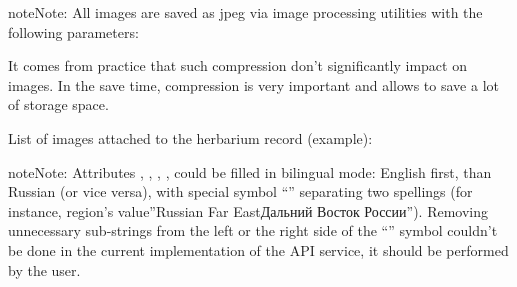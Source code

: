 \documentclass[letterpaper,10pt,english]{sphinxmanual}
\begin{document}
\begin{sphinxadmonition}{note}{Note:}
All images are saved as jpeg via  image processing utilities with the following parameters:

\begin{sphinxVerbatim}[commandchars=\\\{\}]
  
 
\end{sphinxVerbatim}

It comes from practice that such compression don’t significantly impact on images.
In the save time, compression is very important and allows to save a lot of storage space.
\end{sphinxadmonition}

List of images attached to the herbarium record (example):

\begin{sphinxVerbatim}[commandchars=\\\{\}]
\PYG{p}{[}
\PYG{p}{]}
\end{sphinxVerbatim}
\label{\detokenize{http_api:field-reference-label}}
\begin{sphinxadmonition}{note}{Note:}
Attributes , , , , 
could be filled in bilingual mode:
English first, than \textendash{} Russian (or vice versa),
with special symbol “\textbar{}”
separating two spellings
(for instance, region’s value”Russian Far East\textbar{}Дальний Восток России”).
Removing unnecessary sub-strings from the left or
the right side of the “\textbar{}”  symbol couldn’t be done
in the current implementation of the API service,
it should be performed by the user.
\end{sphinxadmonition}
\end{document}
